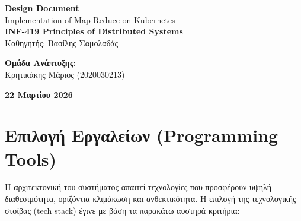 \documentclass[11pt, a4paper]{article}
\begin{document}
\sloppy 

\begin{titlepage}
    \centering
    \vspace*{3cm}
    
    {\Huge \textbf{\color{PrimaryColor} Design Document}}\\[1cm]
    {\LARGE Implementation of Map-Reduce on Kubernetes}\\[2.5cm]
    
    {\Large \textbf{INF-419 Principles of Distributed Systems}}\\[0.5cm]
    {\large Καθηγητής: Βασίλης Σαμολαδάς}\\[2.5cm]
    
    \vfill
    
    \begin{flushleft}
        {\large \textbf{\color{PrimaryColor} Ομάδα Ανάπτυξης:}}\\
        \vspace{0.3cm}
        \large Κρητικάκης Μάριος (2020030213) \\
    \end{flushleft}
    
    \vspace{2cm}
    {\large \textbf{22 Μαρτίου 2026}}
\end{titlepage}

\newpage
\thispagestyle{empty} 
{
  \hypersetup{linkcolor=black} 
  
  \setlength{\baselineskip}{1.5em} 
  
  \tableofcontents
}

\newpage
\setcounter{page}{1}

\section{Επιλογή Εργαλείων (Programming Tools)}
Η αρχιτεκτονική του συστήματος απαιτεί τεχνολογίες που προσφέρουν υψηλή διαθεσιμότητα, οριζόντια κλιμάκωση και ανθεκτικότητα. Η επιλογή της τεχνολογικής στοίβας (tech stack) έγινε με βάση τα παρακάτω αυστηρά κριτήρια:
\end{document}
